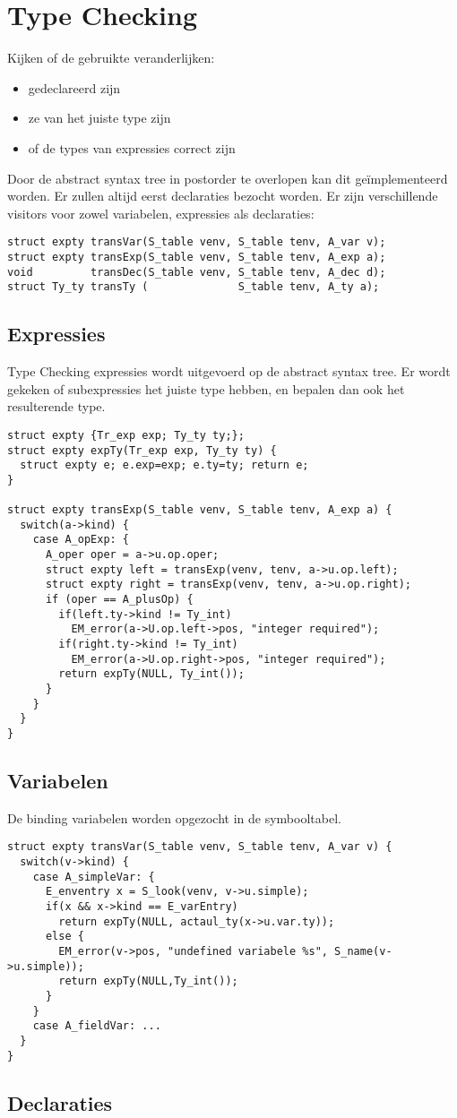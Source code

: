 \section{Type Checking}
Kijken of de gebruikte veranderlijken:
\begin{itemize}
	\item gedeclareerd zijn
	\item ze van het juiste type zijn
	\item of de types van expressies correct zijn
\end{itemize}
Door de abstract syntax tree in postorder te overlopen kan dit geïmplementeerd worden. Er zullen altijd eerst declaraties bezocht worden. Er zijn verschillende visitors voor zowel variabelen, expressies als declaraties:
\begin{lstlisting}
struct expty transVar(S_table venv, S_table tenv, A_var v);
struct expty transExp(S_table venv, S_table tenv, A_exp a);
void         transDec(S_table venv, S_table tenv, A_dec d);
struct Ty_ty transTy (              S_table tenv, A_ty a);
\end{lstlisting}
\subsection{Expressies}
Type Checking expressies wordt uitgevoerd op de abstract syntax tree. Er wordt gekeken of subexpressies het juiste type hebben, en bepalen dan ook het resulterende type.
\begin{lstlisting}
struct expty {Tr_exp exp; Ty_ty ty;};
struct expty expTy(Tr_exp exp, Ty_ty ty) {
  struct expty e; e.exp=exp; e.ty=ty; return e;
}

struct expty transExp(S_table venv, S_table tenv, A_exp a) {
  switch(a->kind) {
    case A_opExp: {
      A_oper oper = a->u.op.oper;
      struct expty left = transExp(venv, tenv, a->u.op.left);
      struct expty right = transExp(venv, tenv, a->u.op.right);
      if (oper == A_plusOp) {
        if(left.ty->kind != Ty_int)
          EM_error(a->U.op.left->pos, "integer required"); 
        if(right.ty->kind != Ty_int)
          EM_error(a->U.op.right->pos, "integer required");
        return expTy(NULL, Ty_int());
      }
    }
  }
}
\end{lstlisting}


\subsection{Variabelen}
De binding variabelen worden opgezocht in de symbooltabel. 
\begin{lstlisting}
struct expty transVar(S_table venv, S_table tenv, A_var v) {
  switch(v->kind) {
    case A_simpleVar: {
      E_enventry x = S_look(venv, v->u.simple);
      if(x && x->kind == E_varEntry)
        return expTy(NULL, actaul_ty(x->u.var.ty));
      else {
        EM_error(v->pos, "undefined variabele %s", S_name(v->u.simple));
        return expTy(NULL,Ty_int());
      }
    }
    case A_fieldVar: ...
  }
}
\end{lstlisting}
\subsection{Declaraties}


